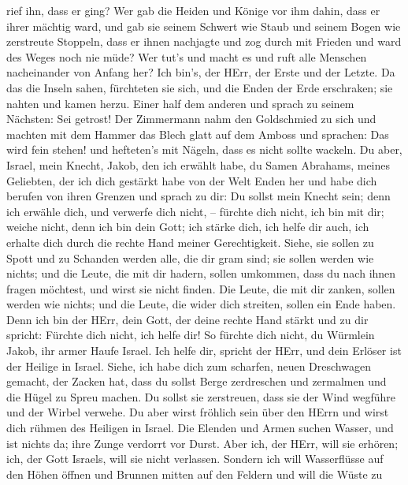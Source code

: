 rief ihn, dass er ging? Wer gab die Heiden und Könige vor ihm dahin,
dass er ihrer mächtig ward, und gab sie seinem Schwert wie Staub und
seinem Bogen wie zerstreute Stoppeln,  dass er ihnen
nachjagte und zog durch mit Frieden und ward des Weges noch nie müde?
 Wer tut's und macht es und ruft alle Menschen nacheinander
von Anfang her? Ich bin's, der HErr, der Erste und der Letzte.
 Da das die Inseln sahen, fürchteten sie sich, und die Enden
der Erde erschraken; sie nahten und kamen herzu.  Einer half
dem anderen und sprach zu seinem Nächsten: Sei getrost!  Der
Zimmermann nahm den Goldschmied zu sich und machten mit dem Hammer das
Blech glatt auf dem Amboss und sprachen: Das wird fein stehen! und
hefteten's mit Nägeln, dass es nicht sollte wackeln.  Du
aber, Israel, mein Knecht, Jakob, den ich erwählt habe, du Samen
Abrahams, meines Geliebten,  der ich dich gestärkt habe von
der Welt Enden her und habe dich berufen von ihren Grenzen und sprach zu
dir: Du sollst mein Knecht sein; denn ich erwähle dich, und verwerfe
dich nicht, --  fürchte dich nicht, ich bin mit dir; weiche
nicht, denn ich bin dein Gott; ich stärke dich, ich helfe dir auch, ich
erhalte dich durch die rechte Hand meiner Gerechtigkeit. 
Siehe, sie sollen zu Spott und zu Schanden werden alle, die dir gram
sind; sie sollen werden wie nichts; und die Leute, die mit dir hadern,
sollen umkommen,  dass du nach ihnen fragen möchtest, und
wirst sie nicht finden. Die Leute, die mit dir zanken, sollen werden wie
nichts; und die Leute, die wider dich streiten, sollen ein Ende haben.
 Denn ich bin der HErr, dein Gott, der deine rechte Hand
stärkt und zu dir spricht: Fürchte dich nicht, ich helfe dir!
 So fürchte dich nicht, du Würmlein Jakob, ihr armer Haufe
Israel. Ich helfe dir, spricht der HErr, und dein Erlöser ist der
Heilige in Israel.  Siehe, ich habe dich zum scharfen,
neuen Dreschwagen gemacht, der Zacken hat, dass du sollst Berge
zerdreschen und zermalmen und die Hügel zu Spreu machen. 
Du sollst sie zerstreuen, dass sie der Wind wegführe und der Wirbel
verwehe. Du aber wirst fröhlich sein über den HErrn und wirst dich
rühmen des Heiligen in Israel.  Die Elenden und Armen
suchen Wasser, und ist nichts da; ihre Zunge verdorrt vor Durst. Aber
ich, der HErr, will sie erhören; ich, der Gott Israels, will sie nicht
verlassen.  Sondern ich will Wasserflüsse auf den Höhen
öffnen und Brunnen mitten auf den Feldern und will die Wüste zu
